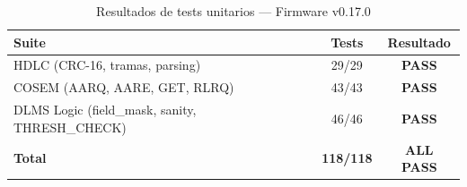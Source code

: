
\begin{table}[htbp]
\centering
\caption{Resultados de tests unitarios — Firmware v0.17.0}
\label{tab:unit-tests-v017}
\begin{tabular}{l c c}
\toprule
\textbf{Suite} & \textbf{Tests} & \textbf{Resultado} \\
\midrule
HDLC (CRC-16, tramas, parsing) & 29/29 & \textcolor{green!60!black}{\textbf{PASS}} \\
COSEM (AARQ, AARE, GET, RLRQ)  & 43/43 & \textcolor{green!60!black}{\textbf{PASS}} \\
DLMS Logic (field\_mask, sanity, THRESH\_CHECK) & 46/46 & \textcolor{green!60!black}{\textbf{PASS}} \\
\midrule
\textbf{Total} & \textbf{118/118} & \textcolor{green!60!black}{\textbf{ALL PASS}} \\
\bottomrule
\end{tabular}
\end{table}
